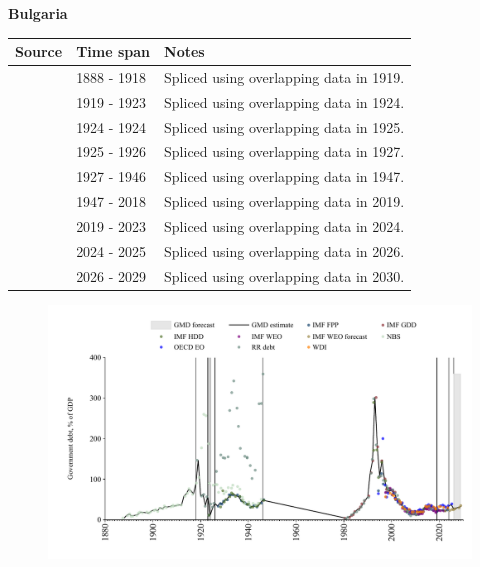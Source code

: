 \documentclass[12pt,a4paper,landscape]{article}
\begin{document}
\begin{adjustbox}{max totalsize={\paperwidth}{\paperheight},center}
\begin{minipage}[t][\textheight][t]{\textwidth}
\vspace*{0.5cm}
{}
\begin{center}
{\Large\bfseries Bulgaria}
\end{center}
\vspace{0.5cm}
\begin{table}[H]
\centering
\small
\begin{tabular}{|l|l|l|}
\hline
\textbf{Source} & \textbf{Time span} & \textbf{Notes} \\
\hline
\rowcolor{white}\cite{NBS}& 1888 - 1918 &Spliced using overlapping data in 1919.\\
\rowcolor{lightgray}\cite{RR_debt}& 1919 - 1923 &Spliced using overlapping data in 1924.\\
\rowcolor{white}\cite{IMF_FPP}& 1924 - 1924 &Spliced using overlapping data in 1925.\\
\rowcolor{lightgray}\cite{RR_debt}& 1925 - 1926 &Spliced using overlapping data in 1927.\\
\rowcolor{white}\cite{IMF_FPP}& 1927 - 1946 &Spliced using overlapping data in 1947.\\
\rowcolor{lightgray}\cite{IMF_GDD}& 1947 - 2018 &Spliced using overlapping data in 2019.\\
\rowcolor{white}\cite{IMF_FPP}& 2019 - 2023 &Spliced using overlapping data in 2024.\\
\rowcolor{lightgray}\cite{OECD_EO}& 2024 - 2025 &Spliced using overlapping data in 2026.\\
\rowcolor{white}\cite{IMF_WEO_forecast}& 2026 - 2029 &Spliced using overlapping data in 2030.\\
\hline
\end{tabular}
\end{table}
\begin{figure}[H]
\centering
\includegraphics[width=\textwidth,height=0.6\textheight,keepaspectratio]{graphs/BGR_govdebt_GDP.pdf}
\end{figure}
\end{minipage}
\end{adjustbox}
\end{document}

